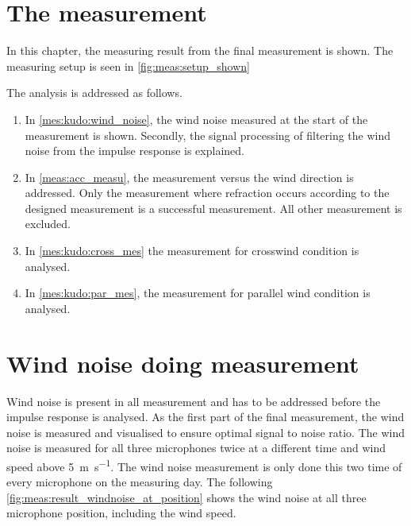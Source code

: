 \section{The measurement}\label{meas:meas_of_kudo}
In this chapter, the measuring result from the final measurement is shown. The measuring setup is seen in \autoref{fig:meas:setup_shown}



The analysis is addressed as follows. 



\begin{enumerate}
\item In \autoref{mes:kudo:wind_noise}, the wind noise measured at the start of the measurement is shown.  Secondly, the signal processing of filtering the wind noise from the impulse response is explained.
\item In \autoref{meas:acc_measu}, the measurement versus the wind direction is addressed. Only the measurement where refraction occurs according to the designed measurement is a successful measurement. All other measurement is excluded.
\item In \autoref{mes:kudo:cross_mes} the measurement for crosswind condition is analysed.
\item In \autoref{mes:kudo:par_mes}, the measurement for parallel wind condition is analysed.
\end{enumerate}

    


\section{Wind noise doing measurement}\label{mes:kudo:wind_noise}
Wind noise is present in all measurement and has to be addressed before the impulse response is analysed. As the first part of the final measurement, the wind noise is measured and visualised to ensure optimal signal to noise ratio. The wind noise is measured for all three microphones twice at a different time and wind speed above \SI{5}{\meter\per\second}. The wind noise measurement is only done this two time of every microphone on the measuring day. The following \autoref{fig:meas:result_windnoise_at_position} shows the wind noise at all three microphone position, including the wind speed.



